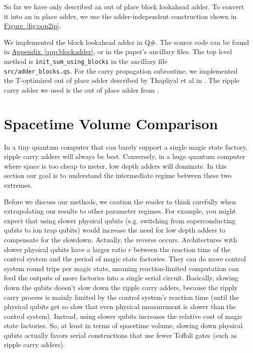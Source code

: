 \documentclass[onecolumn,unpublished]{quantumarticle}
\theoremstyle{definition}
\theoremstyle{definition}
\theoremstyle{definition}
\DeclareRobustCommand{\app}[1]{\hyperref[app:#1]{Appendix~\ref*{app:#1}}}
\newcommand{\fig}[1]{\hyperref[fig:#1]{Figure~\ref*{fig:#1}}}
\begin{document}
So far we have only described an out of place block lookahead adder.
To convert it into an in place adder, we use the adder-independent construction shown in \fig{oop2ip}.

We implemented the block lookahead adder in Q\#.
The source code can be found in \app{blockadder}, or in the paper's ancillary files.
The top level method is \texttt{init\_sum\_using\_blocks} in the ancillary file \\\texttt{src/adder\_blocks.qs}.
For the carry propagation subroutine, we implemented the T-optimized out of place adder described by Thapliyal et al in \cite{thapliyal2020lookahead}.
The ripple carry adder we used is the out of place adder from \cite{gidney2018halving}.


\section{Spacetime Volume Comparison}
\label{sec:estimate}

In a tiny quantum computer that can barely support a single magic state factory, ripple carry adders will always be best.
Conversely, in a huge quantum computer where space is too cheap to meter, low depth adders will dominate.
In this section our goal is to understand the intermediate regime between these two extremes.

Before we discuss our methods, we caution the reader to think carefully when extrapolating our results to other parameter regimes.
For example, you might expect that using slower physical qubits (e.g. switching from superconducting qubits to ion trap qubits) would increase the need for low depth adders to compensate for the slowdown.
Actually, the reverse occurs.
Architectures with slower physical qubits have a larger ratio $r$ between the reaction time of the control system and the period of magic state factories.
They can do more control system round trips per magic state, meaning reaction-limited computation can feed the outputs of more factories into a single serial circuit.
Basically, slowing down the qubits doesn't slow down the ripple carry adders, because the ripply carry process is mainly limited by the control system's reaction time (until the physical qubits get so slow that even physical measurement is slower than the control system).
Instead, using slower qubits increases the relative cost of magic state factories.
So, at least in terms of spacetime volume, slowing down physical qubits actually favors serial constructions that use fewer Toffoli gates (such as ripple carry adders).
\end{document}
